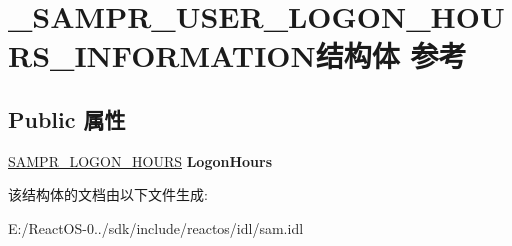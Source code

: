 \hypertarget{struct___s_a_m_p_r___u_s_e_r___l_o_g_o_n___h_o_u_r_s___i_n_f_o_r_m_a_t_i_o_n}{}\section{\+\_\+\+S\+A\+M\+P\+R\+\_\+\+U\+S\+E\+R\+\_\+\+L\+O\+G\+O\+N\+\_\+\+H\+O\+U\+R\+S\+\_\+\+I\+N\+F\+O\+R\+M\+A\+T\+I\+O\+N结构体 参考}
\label{struct___s_a_m_p_r___u_s_e_r___l_o_g_o_n___h_o_u_r_s___i_n_f_o_r_m_a_t_i_o_n}
\subsection*{Public 属性}
\begin{DoxyCompactItemize}
\item 
\mbox{\label{struct___s_a_m_p_r___u_s_e_r___l_o_g_o_n___h_o_u_r_s___i_n_f_o_r_m_a_t_i_o_n_a2a22794263e2c9da50c3074a9dc208ee}} 
\hyperlink{struct___s_a_m_p_r___l_o_g_o_n___h_o_u_r_s}{S\+A\+M\+P\+R\+\_\+\+L\+O\+G\+O\+N\+\_\+\+H\+O\+U\+RS} {\bfseries Logon\+Hours}
\end{DoxyCompactItemize}


该结构体的文档由以下文件生成\+:\begin{DoxyCompactItemize}
\item 
E\+:/\+React\+O\+S-\/0../sdk/include/reactos/idl/sam.\+idl\end{DoxyCompactItemize}
